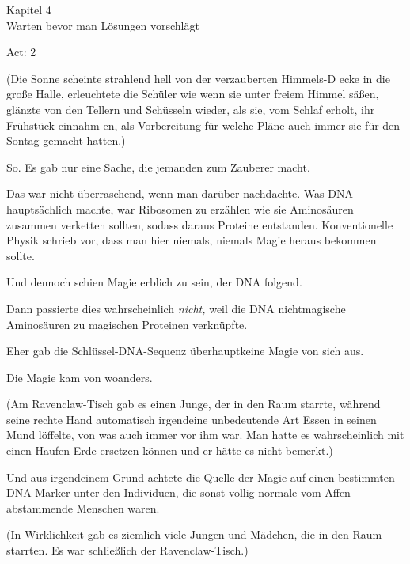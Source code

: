 

\hypertarget{warten-bevor-man-luxf6sungen-vorschluxe4gt}{%

Kapitel 4\\ Warten bevor man Lösungen vorschlägt

Act: 2

(Die Sonne scheinte strahlend hell von der verzauberten Himmels-D ecke in die große Halle, erleuchtete die Schüler wie wenn sie unter freiem Himmel säßen, glänzte von den Tellern und Schüsseln wieder, als sie, vom Schlaf erholt, ihr Frühstück einnahm en, als Vorbereitung für welche Pläne auch immer sie für den Sontag gemacht hatten.)

So. Es gab nur eine Sache, die jemanden zum Zauberer macht.

Das war nicht überraschend, wenn man darüber nachdachte. Was DNA hauptsächlich machte, war Ribosomen zu erzählen wie sie Aminosäuren zusammen verketten sollten, sodass daraus Proteine entstanden. Konventionelle Physik schrieb vor, dass man hier niemals, niemals Magie heraus bekommen sollte.

Und dennoch schien Magie erblich zu sein, der DNA folgend.

Dann passierte dies wahrscheinlich \emph{nicht,} weil die DNA nichtmagische Aminosäuren zu magischen Proteinen verknüpfte.

Eher gab die Schlüssel-DNA-Sequenz überhauptkeine Magie von sich aus.

Die Magie kam von woanders.

(Am Ravenclaw-Tisch gab es einen Junge, der in den Raum starrte, während seine rechte Hand automatisch irgendeine unbedeutende Art Essen in seinen Mund löffelte, von was auch immer vor ihm war. Man hatte es wahrscheinlich mit einen Haufen Erde ersetzen können und er hätte es nicht bemerkt.)

Und aus irgendeinem Grund achtete die Quelle der Magie auf einen bestimmten DNA-Marker unter den Individuen, die sonst vollig normale vom Affen abstammende Menschen waren.

(In Wirklichkeit gab es ziemlich viele Jungen und Mädchen, die in den Raum starrten. Es war schließlich der Ravenclaw-Tisch.)

}
